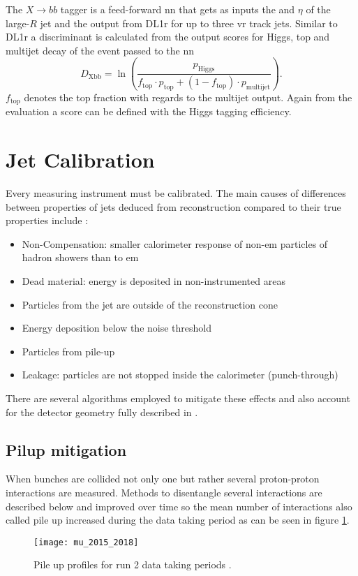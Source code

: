 The $X\rightarrow bb$ tagger is a feed-forward \ac{nn} \citep{ATL-PHYS-PUB-2020-019} that gets as inputs the \pt and $\eta$ of the large-$R$ jet and the output from DL1r for up to three \ac{vr} track jets. Similar to DL1r a discriminant is calculated from the output scores for Higgs, top and multijet decay of the event passed to the \ac{nn}
\begin{equation}
  D_{\text{Xbb}}=\ln\left({\frac{p_{\text{Higgs}}}{f_{\text{top}}\cdot p_{\text{top}}+(1-f_{\text{top}})\cdot p_{\text{multijet}}}}\right).
\end{equation}
$f_\text{top}$ denotes the top fraction with regards to the multijet output. Again from the evaluation a score can be defined with the Higgs tagging efficiency.

\section{Jet Calibration}\label{sec:calibration}
Every measuring instrument must be calibrated. The main causes of differences between properties of jets deduced from reconstruction compared to their true properties include \citep{atlas2011jet}:
\begin{itemize}
  \item Non-Compensation: smaller calorimeter response of non-\ac{em} particles of hadron showers than to \ac{em}
  \item Dead material: energy is deposited in non-instrumented areas
  \item Particles from the jet are outside of the reconstruction cone
  \item Energy deposition below the noise threshold
  \item Particles from pile-up
  \item Leakage: particles are not stopped inside the calorimeter (punch-through)
\end{itemize}
There are several algorithms employed to mitigate these effects and also account for the detector geometry fully described in \citep{atlas2021jet}.

\subsection{Pilup mitigation}
When bunches are collided not only one but rather several proton-proton interactions are measured. Methods to disentangle several interactions are described below and improved over time so the mean number of interactions also called pile up increased during the data taking period as can be seen in figure \ref{fig:pileup}.
\begin{figure}
  \centering
  \texttt{[image: mu\_2015\_2018]}
  \caption[]{Pile up profiles for run 2 data taking periods \citep{pileup}.}
  \label{fig:pileup}
\end{figure}

